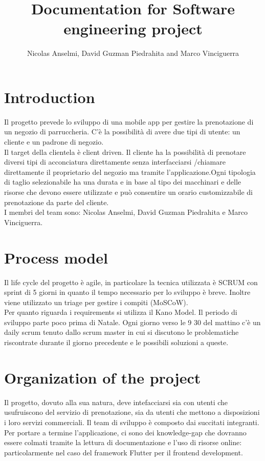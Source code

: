 \documentclass{article}
\title{Documentation for Software engineering project}
\author{Nicolas Anselmi, David Guzman Piedrahita and Marco Vinciguerra}
\begin{document}
\maketitle

\section{Introduction}
Il progetto prevede lo sviluppo di una mobile app per gestire la prenotazione di 
un negozio di parruccheria. C'è la possibilità di avere due tipi di utente:
un cliente e un padrone di negozio.
\\Il target della clientela è client driven.
Il cliente ha la possibilità di prenotare diversi 
tipi di acconciatura direttamente senza interfacciarsi /chiamare direttamente il proprietario
del negozio ma tramite l'applicazione.Ogni tipologia di taglio selezionabile ha una durata e in base al tipo dei macchinari e delle risorse che devono essere utilizzate 
e può consentire un orario customizzabile di prenotazione 
da parte del cliente. 
\\I membri del team sono: Nicolas Anselmi, David Guzman Piedrahita e Marco Vinciguerra.

\section{Process model}
Il life cycle del progetto è agile, in particolare la tecnica utilizzata è SCRUM con
sprint di 5 giorni in quanto il tempo necessario per lo sviluppo è breve. Inoltre viene utilizzato un triage per
gestire i compiti (MoSCoW).
\\Per quanto riguarda i requirements si utilizza il Kano Model.
Il periodo di sviluppo parte poco prima di Natale. Ogni giorno verso le 9 30 del mattino 
c'è un daily scrum tenuto dallo scrum master in cui si discutono le problematiche riscontrate durante 
il giorno precedente e le possibili soluzioni a queste.

\section{Organization of the project}
Il progetto, dovuto alla sua natura, deve intefacciarsi sia con utenti  che usufruiscono del servizio di prenotazione, sia da utenti che mettono a disposizioni i loro servizi commerciali.
Il team di sviluppo è composto dai succitati integranti. Per portare a termine l'applicazione, ci sono dei knowledge-gap che dovranno essere colmati tramite la lettura di documentazione e
l'uso di risorse online: particolarmente nel caso del framework Flutter per il frontend development.
\end{document}
